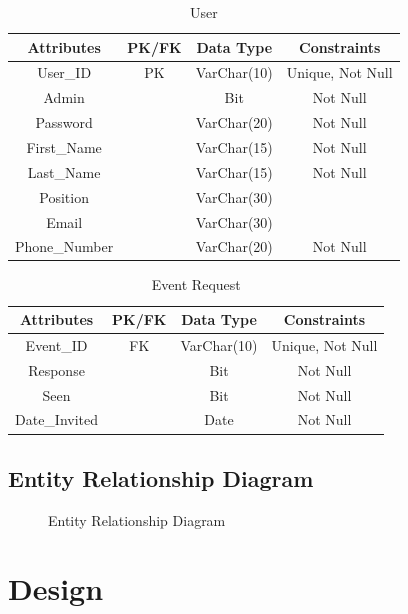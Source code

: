 \documentclass[a4paper]{article}
\begin{document}
\begin{table}[ht]
    \caption{User}
    \centering
    \begin{tabular}{|c|c|c|c|}
        \hline
        Attributes & PK/FK & Data Type & Constraints  \\
        \hline
        User\_ID & PK & VarChar(10) & Unique, Not Null \\
        \hline
        Admin & & Bit & Not Null \\
        \hline
        Password & & VarChar(20) & Not Null \\
        \hline
        First\_Name & & VarChar(15) & Not Null \\
        \hline
        Last\_Name & & VarChar(15) & Not Null \\
        \hline
        Position & & VarChar(30) & \\
        \hline
        Email & & VarChar(30) & \\
        \hline
        Phone\_Number & & VarChar(20) & Not Null \\
        \hline
    \end{tabular}
    \label{tab:user}
\end{table}

\begin{table}[ht] %
    \caption{Event Request}
    \centering
    \begin{tabular}{|c|c|c|c|}
        \hline
        Attributes & PK/FK & Data Type & Constraints  \\
        \hline
        Event\_ID & FK & VarChar(10) & Unique, Not Null \\
        \hline
        Response & & Bit & Not Null \\
        \hline
        Seen & & Bit & Not Null \\
        \hline
        Date\_Invited & & Date & Not Null \\
        \hline
    \end{tabular}
    \label{tab:event_request}
\end{table}


\clearpage
\subsection{Entity Relationship Diagram}
\begin{figure}[!ht]
    \centering{} %
    \caption{Entity Relationship Diagram}
    \label{fig:erd}
\end{figure}

\section{Design}
\end{document}

